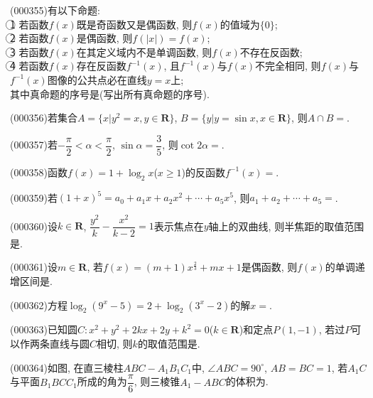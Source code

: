 \item (000355)有以下命题:\\
\textcircled{1} 若函数$f(x)$既是奇函数又是偶函数, 则$f(x)$的值域为$\{0\}$; \\
\textcircled{2} 若函数$f(x)$是偶函数, 则$f(|x|)=f(x)$;\\
\textcircled{3} 若函数$f(x)$在其定义域内不是单调函数, 则$f(x)$不存在反函数;\\
\textcircled{4} 若函数$f(x)$存在反函数${{f}^{-1}}(x)$, 且${{f}^{-1}}(x)$与$f(x)$不完全相同, 则$f(x)$与${{f}^{-1}}(x)$图像的公共点必在直线$y=x$上; \\
其中真命题的序号是(写出所有真命题的序号).
\item (000356)若集合$A=\{x|y^2=x,y\in \mathbf{R}\}$, $B=\{y|y=\sin x,x\in \mathbf{R}\}$, 则$A\cap B=$.
\item (000357)若$-\dfrac{\pi}{2}<\alpha <\dfrac{\pi}{2}$, $\sin \alpha =\dfrac{3}{5}$, 则$\cot 2\alpha =$.
\item (000358)函数$f(x)=1+\log_2 x$($x\ge 1$)的反函数$f^{-1}(x)=$.
\item (000359)若$(1+x)^5=a_0+a_1x+a_2x^2+\cdots+a_5x^5$, 则$a_1+a_2+\cdots+a_5=$.
\item (000360)设$k\in \mathbf{R}$, $\dfrac{y^2}{k}-\dfrac{x^2}{k-2}=1$表示焦点在$y$轴上的双曲线, 则半焦距的取值范围是.
\item (000361)设$m\in \mathbf{R}$, 若$f(x)=(m+1)x^{\tfrac{2}{3}}+mx+1$是偶函数, 则$f(x)$的单调递增区间是.
\item (000362)方程$\log_2(9^x-5)=2+\log_2(3^x-2)$的解$x=$.
\item (000363)已知圆$C:x^2+y^2+2kx+2y+k^2=0$($k\in \mathbf{R}$)和定点$P(1,-1)$, 若过$P$可以作两条直线与圆$C$相切, 则$k$的取值范围是.
\item (000364)如图, 在直三棱柱$ABC-A_1B_1C_1$中, $\angle ABC=90^\circ$, $AB=BC=1$, 若$A_1C$与平面$B_1BCC_1$所成的角为$\dfrac{\pi}{6}$, 则三棱锥$A_1-ABC$的体积为.
\begin{center}
\end{center}
